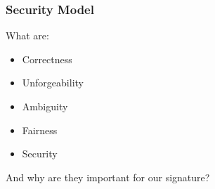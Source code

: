 \begin{frame}
	\frametitle{Security Model}

	What are:
	\begin{itemize}
		\item Correctness
		\item Unforgeability
		\item Ambiguity
		\item Fairness
		\item Security
	\end{itemize}
	And why are they important for our signature?
\end{frame}